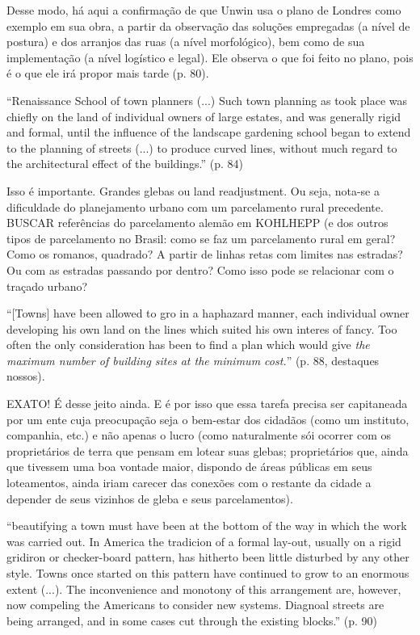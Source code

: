 \documentclass[12pt, a4paper]{book} %
\begin{document}
        Desse modo, há aqui a confirmação de que Unwin usa o plano de Londres como exemplo em sua obra, a partir da observação das soluções empregadas (a nível de postura) e dos arranjos das ruas (a nível morfológico), bem como de sua implementação (a nível logístico e legal). Ele observa o que foi feito no plano, pois é o que ele irá propor mais tarde (p. 80).

        ``Renaissance School of town planners (...) Such town planning as took place was chiefly on the land of individual owners of large estates, and was generally rigid and formal, until the influence of the landscape gardening school began to extend to the planning of streets (...) to produce curved lines, without much regard to the architectural effect of the buildings.'' (p. 84)

        Isso é importante.  Grandes glebas ou land readjustment. Ou seja, nota-se a dificuldade do planejamento urbano com um parcelamento rural precedente.  BUSCAR referências do parcelamento alemão em KOHLHEPP (e dos outros tipos de parcelamento no Brasil: como se faz um parcelamento rural em geral? Como os romanos, quadrado? A partir de linhas retas com limites nas estradas? Ou com as estradas passando por dentro? Como isso pode se relacionar com o traçado urbano?

        ``[Towns] have been allowed to gro in a haphazard manner, each individual owner developing his own land on the lines which suited his own interes of fancy. Too often the only consideration has been to find a plan which would give \textit{the maximum number of building sites at the minimum cost.}'' (p. 88, destaques nossos).

        EXATO! É desse jeito ainda. E é por isso que essa tarefa precisa ser capitaneada por um ente cuja preocupação seja o bem-estar dos cidadãos (como um instituto, companhia, etc.) e não apenas o lucro (como naturalmente sói ocorrer com os proprietários de terra que pensam em lotear suas glebas; proprietários que, ainda que tivessem uma boa vontade maior, dispondo de áreas públicas em seus loteamentos, ainda iriam carecer das conexões com o restante da cidade a depender de seus vizinhos de gleba e seus parcelamentos).

        ``beautifying a town must have been at the bottom of the way in which the work was carried out. In America the tradicion of a formal lay-out, usually on a rigid gridiron or checker-board pattern, has hitherto been little disturbed by any other style. Towns once started on this pattern have continued to grow to an enormous extent (...). The inconvenience and monotony of this arrangement are, however, now compeling the Americans to consider new systems. Diagnoal streets are being arranged, and in some cases cut through the existing blocks.'' (p. 90) %
\end{document}
